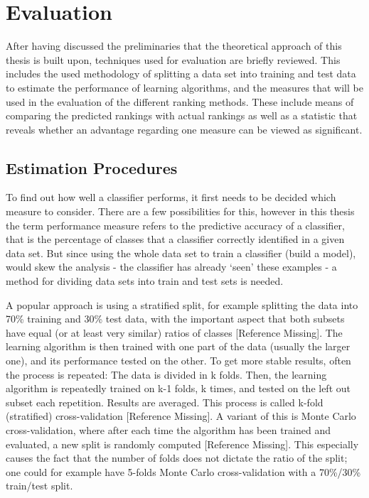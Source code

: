\section{Evaluation}

After having discussed the preliminaries that the theoretical approach of this thesis is built upon, techniques used for evaluation are briefly reviewed. This includes the used methodology of splitting a data set into training and test data to estimate the performance of learning algorithms, and the measures that will be used in the evaluation of the different ranking methods. These include means of comparing the predicted rankings with actual rankings as well as a statistic that reveals whether an advantage regarding one measure can be viewed as significant.

\subsection{Estimation Procedures}

To find out how well a classifier performs, it first needs to be decided which measure to consider. There are a few possibilities for this, however in this thesis the term performance measure refers to the predictive accuracy of a classifier, that is the percentage of classes that a classifier correctly identified in a given data set. But since using the whole data set to train a classifier (build a model), would skew the analysis - the classifier has already `seen' these examples - a method for dividing data sets into train and test sets is needed. 

A popular approach is using a stratified split, for example splitting the data into 70\% training and 30\% test data, with the important aspect that both subsets have equal (or at least very similar) ratios of classes [Reference Missing]. The learning algorithm is then trained with one part of the data (usually the larger one), and its performance tested on the other. To get more stable results, often the process is repeated: The data is divided in k folds. Then, the learning algorithm is repeatedly trained on k-1 folds, k times, and tested on the left out subset each repetition. Results are averaged. This process is called k-fold (stratified) cross-validation [Reference Missing]. A variant of this is Monte Carlo cross-validation, where after each time the algorithm has been trained and evaluated, a new split is randomly computed [Reference Missing]. This especially causes the fact that the number of folds does not dictate the ratio of the split; one could for example have 5-folds Monte Carlo cross-validation with a 70\%/30\% train/test split.

